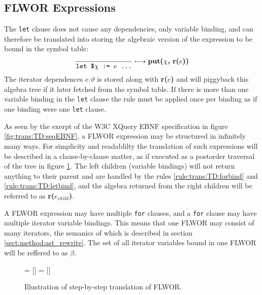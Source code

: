 \subsection{FLWOR Expressions}
\label{sect:trans:TD:simpleFLWOR}
The \texttt{let} clause does not cause any dependencies, only variable binding, and can therefore be translated
into storing the algebraic version of the expression to be bound in the symbol table:
\begin{equation}
\frac{}{\mbox{\texttt{let \$}}\chi \mbox{\texttt{ := }}e \mbox{\texttt{ \ldots}}}\longmapsto
\mbox{\textbf{put(}}\chi\mbox{\textbf{, r(}}e\mbox{\textbf{))}}
\label{rule:trans:TD:letbind}
\end{equation}
The iterator dependences $e.\vartheta$ is stored along with \textbf{r(}$e$\textbf{)} and will piggyback this
algebra tree if it later fetched from the symbol table. If there is more than one variable binding in the
\texttt{let} clause the rule must be applied once per binding as if one binding were one \texttt{let} clause.

As seen by the exerpt of the W3C XQuery EBNF specification in figure \ref{fig:trans:TD:seqEBNF}, a FLWOR
expression may be structured in infinitely many ways. For simplicity and readablilty the translation of such
expressions will be described in a clause-by-clause matter, as if executed as a postorder traversal of the tree in
figure \ref{fig:trans:TD:flworExecute}. The left children (variable bindings) will not return anything to their
parent and are handled by the rules \ref{rule:trans:TD:forbind} and \ref{rule:trans:TD:letbind}, and the algebra
returned from the right children will be referred to as \textbf{r(}$e_{child}$\textbf{)}. 

A FLWOR expression may have multiple \texttt{for} clauses, and a \texttt{for} clause may have multiple iterator
variable bindings. This means that one FLWOR may consist of many iterators, the semanics of which is described in
section \ref{sect:method:ast_rewrite}. The set of all iterator variables bound in one FLWOR will be reffered to as
$\beta$.

\begin{figure}[h]
\centering
{}= []%
= [] %

\label{fig:trans:TD:flworExecute}
\caption[FLWOR translation order]{Illustration of step-by-step translation of FLWOR.}
\end{figure}

